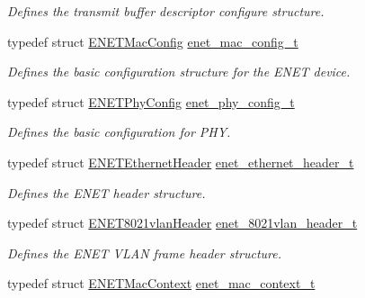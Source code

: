 \begin{DoxyCompactItemize}
\begin{DoxyCompactList}\small\item\em Defines the transmit buffer descriptor configure structure. \end{DoxyCompactList}\item 
typedef struct \hyperlink{structENETMacConfig}{E\+N\+E\+T\+Mac\+Config} \hyperlink{group__enet__driver_ga86d60926903993732e867674045719d9}{enet\+\_\+mac\+\_\+config\+\_\+t}\hypertarget{group__enet__driver_ga86d60926903993732e867674045719d9}{}\label{group__enet__driver_ga86d60926903993732e867674045719d9}

\begin{DoxyCompactList}\small\item\em Defines the basic configuration structure for the E\+N\+ET device. \end{DoxyCompactList}\item 
typedef struct \hyperlink{structENETPhyConfig}{E\+N\+E\+T\+Phy\+Config} \hyperlink{group__enet__driver_ga2ace9b034acffb5bb2bdca4b562e2c69}{enet\+\_\+phy\+\_\+config\+\_\+t}\hypertarget{group__enet__driver_ga2ace9b034acffb5bb2bdca4b562e2c69}{}\label{group__enet__driver_ga2ace9b034acffb5bb2bdca4b562e2c69}

\begin{DoxyCompactList}\small\item\em Defines the basic configuration for P\+HY. \end{DoxyCompactList}\item 
typedef struct \hyperlink{structENETEthernetHeader}{E\+N\+E\+T\+Ethernet\+Header} \hyperlink{group__enet__driver_gab3cfbf313495b99937e3d474339b0776}{enet\+\_\+ethernet\+\_\+header\+\_\+t}\hypertarget{group__enet__driver_gab3cfbf313495b99937e3d474339b0776}{}\label{group__enet__driver_gab3cfbf313495b99937e3d474339b0776}

\begin{DoxyCompactList}\small\item\em Defines the E\+N\+ET header structure. \end{DoxyCompactList}\item 
typedef struct \hyperlink{structENET8021vlanHeader}{E\+N\+E\+T8021vlan\+Header} \hyperlink{group__enet__driver_ga9a3030fa87fee97d274c527fda763791}{enet\+\_\+8021vlan\+\_\+header\+\_\+t}\hypertarget{group__enet__driver_ga9a3030fa87fee97d274c527fda763791}{}\label{group__enet__driver_ga9a3030fa87fee97d274c527fda763791}

\begin{DoxyCompactList}\small\item\em Defines the E\+N\+ET V\+L\+AN frame header structure. \end{DoxyCompactList}\item 
typedef struct \hyperlink{structENETMacContext}{E\+N\+E\+T\+Mac\+Context} \hyperlink{group__enet__driver_gad5e6d3da255845f7cea357156fafb319}{enet\+\_\+mac\+\_\+context\+\_\+t}\hypertarget{group__enet__driver_gad5e6d3da255845f7cea357156fafb319}{}\label{group__enet__driver_gad5e6d3da255845f7cea357156fafb319}


\end{DoxyCompactItemize}
